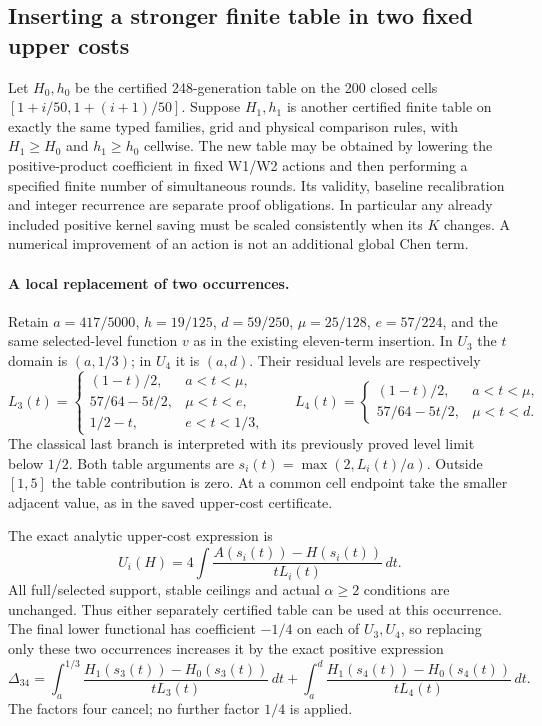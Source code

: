 \subsection{Inserting a stronger finite table in two fixed upper costs}
\label{sec:table-k-feedback-two-cost-insertion-20261009}

Let $H_0,h_0$ be the certified 248-generation table on the 200 closed
cells $[1+i/50,1+(i+1)/50]$. Suppose $H_1,h_1$ is another certified
finite table on exactly the same typed families, grid and physical
comparison rules, with $H_1\ge H_0$ and $h_1\ge h_0$ cellwise.
The new table may be obtained by lowering the positive-product
coefficient in fixed W1/W2 actions and then performing a specified
finite number of simultaneous rounds. Its validity, baseline
recalibration and integer recurrence are separate proof obligations.
In particular any already included positive kernel saving must be
scaled consistently when its $K$ changes. A numerical improvement of
an action is not an additional global Chen term.

\paragraph{A local replacement of two occurrences.}
Retain $a=417/5000$, $h=19/125$, $d=59/250$, $\mu=25/128$,
$e=57/224$, and the same selected-level function $v$ as in the
existing eleven-term insertion. In $U_3$ the $t$ domain is $(a,1/3)$;
in $U_4$ it is $(a,d)$. Their residual levels are respectively
\[
 L_3(t)=\begin{cases}(1-t)/2,&a<t<\mu,\\
                  57/64-5t/2,&\mu<t<e,\\
                  1/2-t,&e<t<1/3,
          \end{cases}
 \qquad
 L_4(t)=\begin{cases}(1-t)/2,&a<t<\mu,\\
                  57/64-5t/2,&\mu<t<d.
          \end{cases}
\]
The classical last branch is interpreted with its previously proved
level limit below $1/2$. Both table arguments are
$s_i(t)=\max(2,L_i(t)/a)$. Outside $[1,5]$ the table contribution is
zero. At a common cell endpoint take the smaller adjacent value,
as in the saved upper-cost certificate.

The exact analytic upper-cost expression is
\[
 U_i(H)=4\int\frac{A(s_i(t))-H(s_i(t))}{tL_i(t)}\,dt.
\]
All full/selected support, stable ceilings and actual $\alpha\ge2$
conditions are unchanged. Thus either separately certified table can
be used at this occurrence. The final lower functional has coefficient
$-1/4$ on each of $U_3,U_4$, so replacing only these two occurrences
increases it by the exact positive expression
\begin{equation}\label{eq:two-cost-table-gain}
 \Delta_{34}=
 \int_a^{1/3}\frac{H_1(s_3(t))-H_0(s_3(t))}{tL_3(t)}\,dt
 +\int_a^d\frac{H_1(s_4(t))-H_0(s_4(t))}{tL_4(t)}\,dt.
\end{equation}
The factors four cancel; no further factor $1/4$ is applied.

